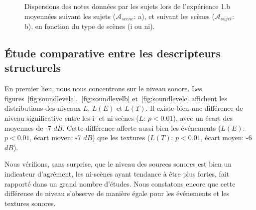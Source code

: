 \begin{figure}[t]
        \myfloatalign
       \caption{Dispersions des notes données par les sujets lors de l'expérience 1.b moyennées suivant les sujets ($\mathcal{A}_{scene}$: a), et suivant les scènes ($\mathcal{A}_{sujet}$: b), en fonction du type de scènes (i ou ni).}\label{fig:xp2_A}
\end{figure}
 
\subsection[Descripteurs structurels]{Étude comparative entre les descripteurs structurels}

En premier lieu, nous nous concentrons sur le niveau sonore. Les figures~\ref{fig:soundlevela},~\ref{fig:soundlevelb} et~\ref{fig:soundlevelc} affichent les distributions des niveaux $L$, $L(E)$ et $L(T)$. Il existe bien une différence de niveau significative entre les i- et ni-scènes ($L$: $p<0.01$), avec un écart des moyennes de -7 $dB$. Cette différence affecte aussi bien les événements ($L(E)$: $p<0.01$, écart moyen: -7 $dB$) que les textures ($L(T)$: $p<0.01$, écart moyen: -6 $dB$). 

Nous vérifions, sans surprise, que le niveau des sources sonores est bien un indicateur d'agrément, les ni-scènes ayant tendance à être plus fortes, fait rapporté dans un grand nombre d'études. Nous constatons encore que cette différence de niveau s'observe de manière égale pour les événements et les textures sonores. 

